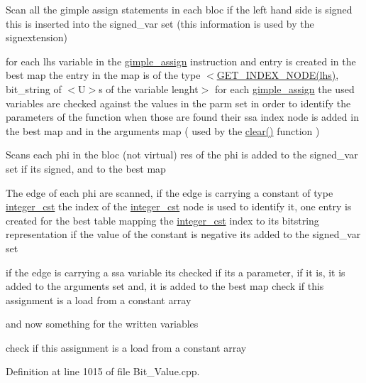 Scan all the gimple assign statements in each bloc if the left hand side is signed this is inserted into the signed\+\_\+var set (this information is used by the signextension)

for each lhs variable in the \hyperlink{structgimple__assign}{gimple\+\_\+assign} instruction and entry is created in the best map the entry in the map is of the type $<$\hyperlink{tree__node_8hpp_a00ddbcaa37bcf886161a188d57bcbde6}{G\+E\+T\+\_\+\+I\+N\+D\+E\+X\+\_\+\+N\+O\+D\+E(lhs)}, bit\+\_\+string of $<$\+U$>$s of the variable lenght$>$ for each \hyperlink{structgimple__assign}{gimple\+\_\+assign} the used variables are checked against the values in the parm set in order to identify the parameters of the function when those are found their ssa index node is added in the best map and in the arguments map ( used by the \hyperlink{classBitLatticeManipulator_a42eb6c4e6540a538398764f35761dbe3}{clear()} function )

Scans each phi in the bloc (not virtual) res of the phi is added to the signed\+\_\+var set if it\textquotesingle{}s signed, and to the best map

The edge of each phi are scanned, if the edge is carrying a constant of type \hyperlink{structinteger__cst}{integer\+\_\+cst} the index of the \hyperlink{structinteger__cst}{integer\+\_\+cst} node is used to identify it, one entry is created for the best table mapping the \hyperlink{structinteger__cst}{integer\+\_\+cst} index to its bitstring representation if the value of the constant is negative it\textquotesingle{}s added to the signed\+\_\+var set

if the edge is carrying a ssa variable it\textquotesingle{}s checked if its a parameter, if it is, it is added to the arguments set and, it is added to the best map check if this assignment is a load from a constant array

and now something for the written variables

check if this assignment is a load from a constant array 

Definition at line 1015 of file Bit\+\_\+\+Value.\+cpp.



